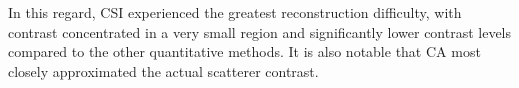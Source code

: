 \documentclass{IEEEtran}
\begin{document}
                In this regard, CSI experienced the greatest reconstruction difficulty, with contrast concentrated in a very small region and significantly lower contrast levels compared to the other quantitative methods. It is also notable that CA most closely approximated the actual scatterer contrast.

                \begin{figure}[!htb]
                    \centering
                     \\

\end{figure}
\end{document}

